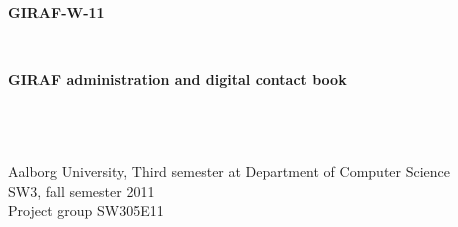 \thispagestyle{empty}
\begin{center}
	\hrulefill\newline
	\\
	\begin{LARGE}	
	\textbf{GIRAF-W-11}
	\end{LARGE}
	\\
	\begin{large} 
	\textbf{GIRAF administration and digital contact book}
	\end{large}\\
	\hrulefill\newline
	\\~\\
	Aalborg University, Third semester at Department of Computer Science \\
	SW3, fall semester 2011	\\
	Project group SW305E11\\
\end{center}